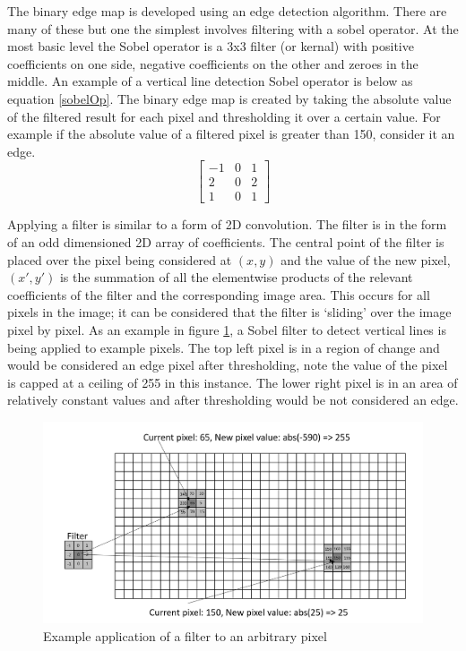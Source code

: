\documentclass{article}
\begin{document}
	 The binary edge map is developed using an edge detection algorithm. There are many of these but one the simplest involves filtering with a sobel operator. At the most basic level the Sobel operator is a 3x3 filter (or kernal) with positive coefficients on one side, negative coefficients on the other and zeroes in the middle. An example of a vertical line detection Sobel operator is below as equation \ref{sobelOp}. The binary edge map is created by taking the absolute value of the filtered result for each pixel and thresholding it over a certain value. For example if the absolute value of a filtered pixel is greater than 150, consider it an edge. \\

	\begin{equation}\label{sobelOp}
		\begin{bmatrix} 
		-1 & 0 & 1 \\ 
		2 & 0 & 2 \\ 
		1 & 0 & 1  
		\end{bmatrix}
	\end{equation}
	 	 
	 Applying a filter is similar to a form of 2D convolution. The filter is in the form of an odd dimensioned 2D array of coefficients. The central point of the filter is placed over the pixel being considered at $(x,y)$ and the value of the new pixel,  $(x',y')$ is the summation of all the elementwise products of the relevant coefficients of the filter and the corresponding image area. This occurs for all pixels in the image; it can be considered that the filter is `sliding' over the image pixel by pixel. As an example in figure \ref{filter}, a Sobel filter to detect vertical lines is being applied to example pixels. The top left pixel is in a region of change and would be considered an edge pixel after thresholding, note the value of the pixel is capped at a ceiling of 255 in this instance. The lower right pixel is in an area of relatively constant values and after thresholding would be not considered an edge.
	
	\begin{figure}
		\centering
		\includegraphics[width=5.0in]{filter}
		\caption{Example application of a filter to an arbitrary pixel}
		\label{filter}
	\end{figure}
\end{document}
